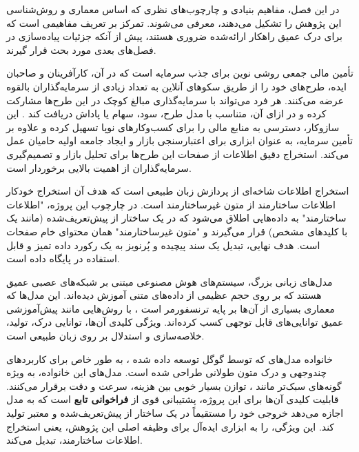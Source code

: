 

در این فصل، مفاهیم بنیادی و چارچوب‌های نظری که اساس معماری و روش‌شناسی این پژوهش را تشکیل می‌دهند، معرفی می‌شوند. تمرکز بر تعریف مفاهیمی است که برای درک عمیق راهکار ارائه‌شده ضروری هستند، پیش از آنکه جزئیات پیاده‌سازی در فصل‌های بعدی مورد بحث قرار گیرند.

تأمین مالی جمعی روشی نوین برای جذب سرمایه است که در آن، کارآفرینان و صاحبان ایده، طرح‌های خود را از طریق سکوهای آنلاین به تعداد زیادی از سرمایه‌گذاران بالقوه عرضه می‌کنند. هر فرد می‌تواند با سرمایه‌گذاری مبالغ کوچک در این طرح‌ها مشارکت کرده و در ازای آن، متناسب با مدل طرح، سود، سهام یا پاداش دریافت کند \cite{mollick2014dynamics}. این سازوکار، دسترسی به منابع مالی را برای کسب‌وکارهای نوپا تسهیل کرده و علاوه بر تأمین سرمایه، به عنوان ابزاری برای اعتبارسنجی بازار و ایجاد جامعه اولیه حامیان عمل می‌کند. استخراج دقیق اطلاعات از صفحات این طرح‌ها برای تحلیل بازار و تصمیم‌گیری سرمایه‌گذاران از اهمیت بالایی برخوردار است.


استخراج اطلاعات شاخه‌ای از پردازش زبان طبیعی است که هدف آن استخراج خودکار اطلاعات ساختارمند از متون غیرساختارمند است. در چارچوب این پروژه، "اطلاعات ساختارمند" به داده‌هایی اطلاق می‌شود که در یک ساختار از پیش‌تعریف‌شده (مانند یک  با کلیدهای مشخص) قرار می‌گیرند و "متون غیرساختارمند" همان محتوای خام صفحات  است. هدف نهایی، تبدیل یک سند  پیچیده و پُرنویز به یک رکورد داده تمیز و قابل استفاده در پایگاه داده است.


مدل‌های زبانی بزرگ، سیستم‌های هوش مصنوعی مبتنی بر شبکه‌های عصبی عمیق هستند که بر روی حجم عظیمی از داده‌های متنی آموزش دیده‌اند. این مدل‌ها که معماری بسیاری از آن‌ها بر پایه ترنسفورمر است \cite{vaswani2017attention}، با روش‌هایی مانند پیش‌آموزشی عمیق \cite{devlin2018bert, brown2020language} توانایی‌های قابل توجهی کسب کرده‌اند. ویژگی کلیدی آن‌ها، توانایی درک، تولید، خلاصه‌سازی و استدلال بر روی زبان طبیعی است.

خانواده مدل‌های  که توسط گوگل توسعه داده شده \cite{google2023gemini}، به طور خاص برای کاربردهای چندوجهی و درک متون طولانی طراحی شده است. مدل‌های این خانواده، به ویژه گونه‌های سبک‌تر مانند ، توازن بسیار خوبی بین هزینه، سرعت و دقت برقرار می‌کنند. قابلیت کلیدی آن‌ها برای این پروژه، پشتیبانی قوی از \textbf{فراخوانی تابع} است که به مدل اجازه می‌دهد خروجی خود را مستقیماً در یک ساختار از پیش‌تعریف‌شده و معتبر تولید کند. این ویژگی،  را به ابزاری ایده‌آل برای وظیفه اصلی این پژوهش، یعنی استخراج اطلاعات ساختارمند، تبدیل می‌کند.

